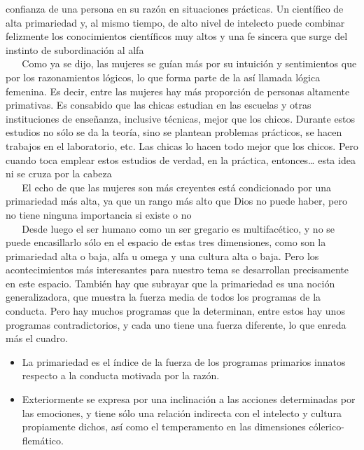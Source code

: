 confianza de una persona en su razón en situaciones prácticas. Un
científico de alta primariedad y, al mismo tiempo, de alto nivel de
intelecto puede combinar felizmente los conocimientos científicos muy
altos y una fe sincera que surge del instinto de subordinación al alfa\\
\hspace*{0.333em} ~ ~ Como ya se dijo, las mujeres se guían más por su
intuición y sentimientos que por los razonamientos lógicos, lo que forma
parte de la así llamada lógica femenina. Es decir, entre las mujeres hay
más proporción de personas altamente primativas. Es consabido que las
chicas estudian en las escuelas y otras instituciones de enseñanza,
inclusive técnicas, mejor que los chicos. Durante estos estudios no sólo
se da la teoría, sino se plantean problemas prácticos, se hacen trabajos
en el laboratorio, etc. Las chicas lo hacen todo mejor que los chicos.
Pero cuando toca emplear estos estudios de verdad, en la práctica,
entonces\ldots{} esta idea ni se cruza por la cabeza\\
\hspace*{0.333em} ~ ~ El echo de que las mujeres son más creyentes está
condicionado por una primariedad más alta, ya que un rango más alto que
Dios no puede haber, pero no tiene ninguna importancia si existe o no\\
\hspace*{0.333em} ~ ~ Desde luego el ser humano como un ser gregario es
multifacético, y no se puede encasillarlo sólo en el espacio de estas
tres dimensiones, como son la primariedad alta o baja, alfa u omega y
una cultura alta o baja. Pero los acontecimientos más interesantes para
nuestro tema se desarrollan precisamente en este espacio. También hay
que subrayar que la primariedad es una noción generalizadora, que
muestra la fuerza media de todos los programas de la conducta. Pero hay
muchos programas que la determinan, entre estos hay unos programas
contradictorios, y cada uno tiene una fuerza diferente, lo que enreda
más el cuadro.

\begin{itemize}
\tightlist
\item
  La primariedad es el índice de la fuerza de los programas primarios
  innatos respecto a la conducta motivada por la razón.
\item
  Exteriormente se expresa por una inclinación a las acciones
  determinadas por las emociones, y tiene sólo una relación indirecta
  con el intelecto y cultura propiamente dichos, así como el
  temperamento en las dimensiones cólerico-flemático.
\end{itemize}

